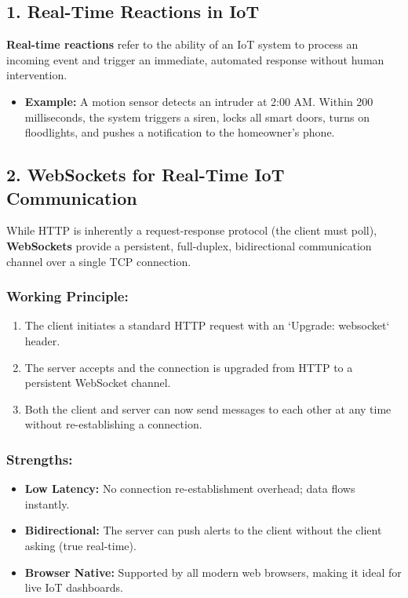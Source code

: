\subsection{1. Real-Time Reactions in IoT}
\textbf{Real-time reactions} refer to the ability of an IoT system to process an incoming event and trigger an immediate, automated response without human intervention.
\begin{itemize}
  \item   \textbf{Example:} A motion sensor detects an intruder at 2:00 AM. Within 200 milliseconds, the system triggers a siren, locks all smart doors, turns on floodlights, and pushes a notification to the homeowner's phone.
\end{itemize}


\subsection{2. WebSockets for Real-Time IoT Communication}
While HTTP is inherently a request-response protocol (the client must poll), \textbf{WebSockets} provide a persistent, full-duplex, bidirectional communication channel over a single TCP connection.

\subsubsection{Working Principle:}
\begin{enumerate}
  \item The client initiates a standard HTTP request with an `Upgrade: websocket` header.
  \item The server accepts and the connection is upgraded from HTTP to a persistent WebSocket channel.
  \item Both the client and server can now send messages to each other at any time without re-establishing a connection.
\end{enumerate}

\subsubsection{Strengths:}
\begin{itemize}
  \item   \textbf{Low Latency:} No connection re-establishment overhead; data flows instantly.
  \item   \textbf{Bidirectional:} The server can push alerts to the client without the client asking (true real-time).
  \item   \textbf{Browser Native:} Supported by all modern web browsers, making it ideal for live IoT dashboards.
\end{itemize}

